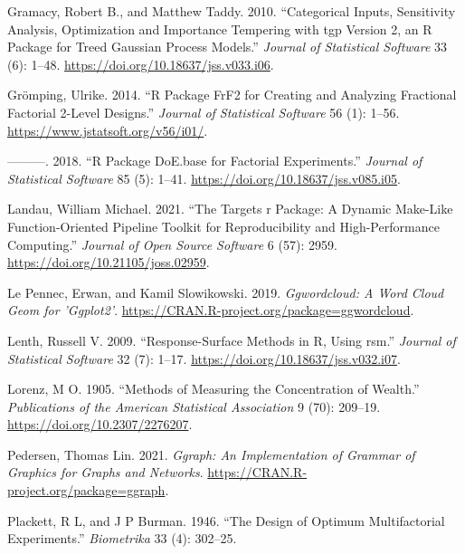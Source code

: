 \documentclass{article}
\newlength{\cslhangindent}
\newlength{\cslentryspacingunit} %
\newenvironment{CSLReferences}[2] %
 {%
  \setlength{\parindent}{0pt}
  \ifodd #1
  \let\oldpar\par
  \def\par{\hangindent=\cslhangindent\oldpar}
  \fi
  \setlength{\parskip}{#2\cslentryspacingunit}
 }%
 {}
\begin{document}
\begin{CSLReferences}{1}{0}
\leavevmode{}%
Gramacy, Robert B., and Matthew Taddy. 2010. {``Categorical Inputs,
Sensitivity Analysis, Optimization and Importance Tempering with {tgp}
Version 2, an {R} Package for Treed Gaussian Process Models.''}
\emph{Journal of Statistical Software} 33 (6): 1--48.
\url{https://doi.org/10.18637/jss.v033.i06}.

\leavevmode{}%
Grömping, Ulrike. 2014. {``{R} Package {FrF2} for Creating and Analyzing
Fractional Factorial 2-Level Designs.''} \emph{Journal of Statistical
Software} 56 (1): 1--56. \url{https://www.jstatsoft.org/v56/i01/}.

\leavevmode{}%
---------. 2018. {``{R} Package {DoE.base} for Factorial Experiments.''}
\emph{Journal of Statistical Software} 85 (5): 1--41.
\url{https://doi.org/10.18637/jss.v085.i05}.

\leavevmode{}%
Landau, William Michael. 2021. {``The Targets r Package: A Dynamic
Make-Like Function-Oriented Pipeline Toolkit for Reproducibility and
High-Performance Computing.''} \emph{Journal of Open Source Software} 6
(57): 2959. \url{https://doi.org/10.21105/joss.02959}.

\leavevmode{}%
Le Pennec, Erwan, and Kamil Slowikowski. 2019. \emph{Ggwordcloud: A Word
Cloud Geom for 'Ggplot2'}.
\url{https://CRAN.R-project.org/package=ggwordcloud}.

\leavevmode{}%
Lenth, Russell V. 2009. {``Response-Surface Methods in {R}, Using
{rsm}.''} \emph{Journal of Statistical Software} 32 (7): 1--17.
\url{https://doi.org/10.18637/jss.v032.i07}.

\leavevmode{}%
Lorenz, M O. 1905. {``Methods of Measuring the Concentration of
Wealth.''} \emph{Publications of the American Statistical Association} 9
(70): 209--19. \url{https://doi.org/10.2307/2276207}.

\leavevmode{}%
Pedersen, Thomas Lin. 2021. \emph{Ggraph: An Implementation of Grammar
of Graphics for Graphs and Networks}.
\url{https://CRAN.R-project.org/package=ggraph}.

\leavevmode{}%
Plackett, R L, and J P Burman. 1946. {``The Design of Optimum
Multifactorial Experiments.''} \emph{Biometrika} 33 (4): 302--25.


\end{CSLReferences}
\end{document}
